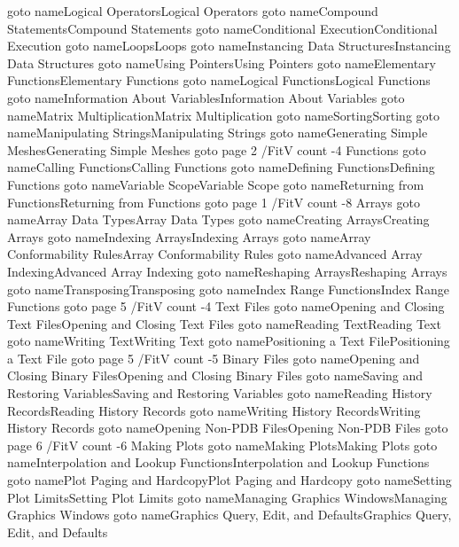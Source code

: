       \pdfoutline goto name{Logical Operators}{Logical Operators}
      \pdfoutline goto name{Compound Statements}{Compound Statements}
      \pdfoutline goto name{Conditional Execution}{Conditional Execution}
      \pdfoutline goto name{Loops}{Loops}
      \pdfoutline goto name{Instancing Data Structures}{Instancing Data Structures}
      \pdfoutline goto name{Using Pointers}{Using Pointers}
      \pdfoutline goto name{Elementary Functions}{Elementary Functions}
      \pdfoutline goto name{Logical Functions}{Logical Functions}
      \pdfoutline goto name{Information About Variables}{Information About Variables}
      \pdfoutline goto name{Matrix Multiplication}{Matrix Multiplication}
      \pdfoutline goto name{Sorting}{Sorting}
      \pdfoutline goto name{Manipulating Strings}{Manipulating Strings}
      \pdfoutline goto name{Generating Simple Meshes}{Generating Simple Meshes}
    \pdfoutline goto page 2 {/FitV} count -4 {Functions}
      \pdfoutline goto name{Calling Functions}{Calling Functions}
      \pdfoutline goto name{Defining Functions}{Defining Functions}
      \pdfoutline goto name{Variable Scope}{Variable Scope}
      \pdfoutline goto name{Returning from Functions}{Returning from Functions}
    \pdfoutline goto page 1 {/FitV} count -8 {Arrays}
      \pdfoutline goto name{Array Data Types}{Array Data Types}
      \pdfoutline goto name{Creating Arrays}{Creating Arrays}
      \pdfoutline goto name{Indexing Arrays}{Indexing Arrays}
      \pdfoutline goto name{Array Conformability Rules}{Array Conformability Rules}
      \pdfoutline goto name{Advanced Array Indexing}{Advanced Array Indexing}
      \pdfoutline goto name{Reshaping Arrays}{Reshaping Arrays}
      \pdfoutline goto name{Transposing}{Transposing}
      \pdfoutline goto name{Index Range Functions}{Index Range Functions}
    \pdfoutline goto page 5 {/FitV} count -4 {Text Files}
      \pdfoutline goto name{Opening and Closing Text Files}{Opening and Closing Text Files}
      \pdfoutline goto name{Reading Text}{Reading Text}
      \pdfoutline goto name{Writing Text}{Writing Text}
      \pdfoutline goto name{Positioning a Text File}{Positioning a Text File}
    \pdfoutline goto page 5 {/FitV} count -5 {Binary Files}
      \pdfoutline goto name{Opening and Closing Binary Files}{Opening and Closing Binary Files}
      \pdfoutline goto name{Saving and Restoring Variables}{Saving and Restoring Variables}
      \pdfoutline goto name{Reading History Records}{Reading History Records}
      \pdfoutline goto name{Writing History Records}{Writing History Records}
      \pdfoutline goto name{Opening Non-PDB Files}{Opening Non-PDB Files}
    \pdfoutline goto page 6 {/FitV} count -6 {Making Plots}
      \pdfoutline goto name{Making Plots}{Making Plots}
      \pdfoutline goto name{Interpolation and Lookup Functions}{Interpolation and Lookup Functions}
      \pdfoutline goto name{Plot Paging and Hardcopy}{Plot Paging and Hardcopy}
      \pdfoutline goto name{Setting Plot Limits}{Setting Plot Limits}
      \pdfoutline goto name{Managing Graphics Windows}{Managing Graphics Windows}
      \pdfoutline goto name{Graphics Query, Edit, and Defaults}{Graphics Query, Edit, and Defaults}  
\fi


